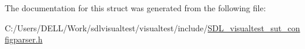 The documentation for this struct was generated from the following file\-:\begin{DoxyCompactItemize}
\item 
C\-:/\-Users/\-D\-E\-L\-L/\-Work/sdlvisualtest/visualtest/include/\hyperlink{_s_d_l__visualtest__sut__configparser_8h}{S\-D\-L\-\_\-visualtest\-\_\-sut\-\_\-configparser.\-h}\end{DoxyCompactItemize}
